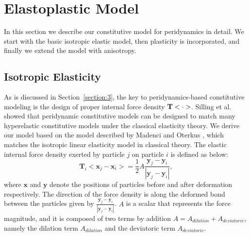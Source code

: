 \section{Elastoplastic Model}

In this section we describe our constitutive model for peridynamics in detail. We start with the basic isotropic elastic model, then plasticity is incorporated, and finally we extend the model with anisotropy.

\subsection{Isotropic Elasticity}\label{section:4.1}

As is discussed in Section~\ref{section:3}, the key to peridynamics-based constitutive modeling is the design of proper internal force density $\nobreak{\mathbf{T}<\cdot>}$. Silling et al.\cite{silling2007peridynamic} showed that peridynamic constitutive models can be designed to match many hyperelastic constitutive models under the classical elasticity theory. We derive our model based on the model described by Madenci and Oterkus \cite{madenci2014peridynamic}, which matches the isotropic linear elasticity model in classical theory. The elastic internal force density exerted by particle $j$ on particle $i$ is defined as below:
\begin{equation}
\mathbf{T}_i<\mathbf{x}_j-\mathbf{x}_i> = \frac{1}{2}A\frac{\mathbf{y}_j-\mathbf{y}_i}{|\mathbf{y}_j-\mathbf{y}_i|},
\label{eq:2}
\end{equation}
where $\mathbf{x}$ and $\mathbf{y}$ denote the positions of particles before and after deformation respectively. The direction of the force density is along the deformed bond between the particles given by $\frac{\mathbf{y}_j-\mathbf{y}_i}{|\mathbf{y}_j-\mathbf{y}_i|}$. $A$ is a scalar that represents the force magnitude, and it is composed of two terms by addition $A = A_{dilation} + A_{deviatoric}$, namely the dilation term $A_{dilation}$ and the deviatoric term $A_{deviatoric}$.

